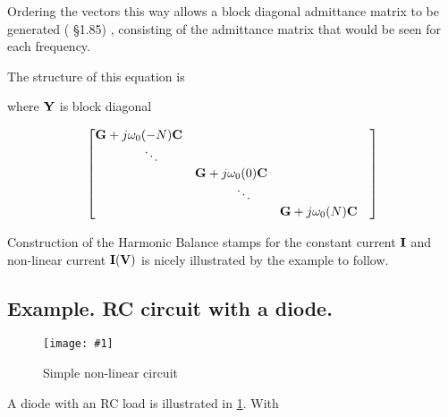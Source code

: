 \documentclass[12pt,journal,compsoc]{../ieeepaper/IEEEtran}
\newcommand{\imageFigureHere}[4]{%
\begin{figure}[!h]%
\centering%
\texttt{[image: \#1]}%
\caption{#2}%
\label{#3}%
\end{figure}%
}
\begin{document}
Ordering the vectors this way allows a block diagonal admittance matrix to be generated (\citep{giannini2004NonlinearMicrowaveCircuitDesign}
 \S 1.85)
, consisting of the admittance matrix that would be seen for each frequency.

The structure of this equation is


where \( \mathbf{Y} \) is block diagonal

\begin{equation}\label{eqn:ece1254projectReport:1360}
\small{
\begin{bmatrix}
\BG + j \omega_0 (-N) \BC &        &                                   & \\
                            \qquad\ddots &                                   & \\
                                   &  \BG + j \omega_0 (0) \BC         & \\
                                   &                            \qquad\ddots & \\
                                   &                                   & \BG + j \omega_0 (N) \BC  
\end{bmatrix}
}
\end{equation}

Construction of the Harmonic Balance stamps for the constant current \( \mathbf{I} \) and non-linear current \( \mathbf{I}(\mathbf{V}) \) is nicely illustrated by the example to follow.

\subsection{Example.  RC circuit with a diode.}

\imageFigureHere{../../figures/ece1254/diodeWithResistorAndCapacitorFig1}{Simple non-linear circuit}{fig:diodeWithResistorAndCapacitorFig1}{3in}

A diode with an RC load is illustrated in 
\cref{fig:diodeWithResistorAndCapacitorFig1}.
With
\end{document}
